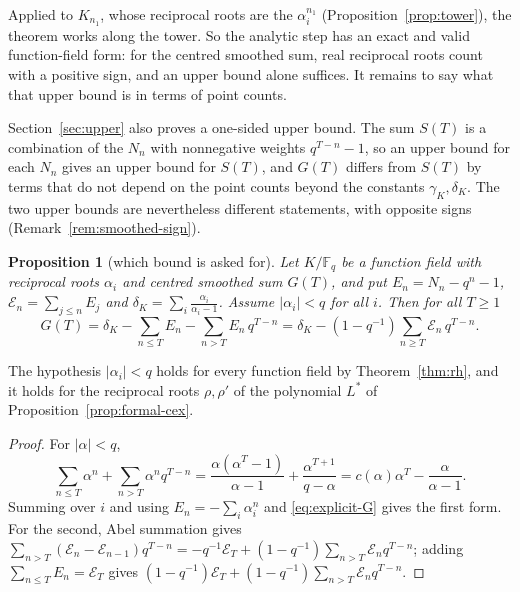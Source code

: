 \documentclass[11pt]{amsbook}
\theoremstyle{plain}
\newtheorem{proposition}[theorem]{Proposition}
\theoremstyle{definition}
\theoremstyle{remark}
\numberwithin{equation}{section}
\numberwithin{figure}{chapter}
\numberwithin{table}{chapter}
\newcommand{\F}{\mathbb{F}}
\newcommand{\calE}{\mathcal{E}}
\begin{document}
Applied to $K_{n_1}$, whose reciprocal roots are the
$\alpha_i^{n_1}$ (Proposition~\ref{prop:tower}), the theorem works
along the tower. So the analytic step has an exact and valid
function-field form: for the centred smoothed sum, real reciprocal
roots count with a positive sign, and an upper bound alone
suffices. It remains to say what that upper bound is in terms of
point counts.

Section~\ref{sec:upper} also proves a one-sided upper bound. The
sum $S(T)$ is a combination of the $N_n$ with nonnegative weights
$q^{T-n}-1$, so an upper bound for each $N_n$ gives an upper bound
for $S(T)$, and $G(T)$ differs from $S(T)$ by terms that do not
depend on the point counts beyond the constants
$\gamma_K,\delta_K$. The two upper bounds are nevertheless different
statements, with opposite signs (Remark~\ref{rem:smoothed-sign}).

\begin{proposition}[which bound is asked for]
\label{prop:which-bound}
Let $K/\F_q$ be a function field with reciprocal roots $\alpha_i$
and centred smoothed sum $G(T)$, and put $E_n=N_n-q^n-1$,
$\calE_n=\sum_{j\le n}E_j$ and
$\delta_K=\sum_i\frac{\alpha_i}{\alpha_i-1}$. Assume
$\lvert\alpha_i\rvert<q$ for all $i$. Then for all $T\ge1$
\begin{equation}\label{eq:which-bound}
G(T)=\delta_K-\sum_{n\le T}E_n-\sum_{n>T}E_n\,q^{T-n}
=\delta_K-(1-q^{-1})\sum_{n\ge T}\calE_n\,q^{T-n}.
\end{equation}
\end{proposition}

The hypothesis $\lvert\alpha_i\rvert<q$ holds for every function
field by Theorem~\ref{thm:rh}, and it holds for the reciprocal roots
$\rho,\rho'$ of the polynomial $L^*$ of
Proposition~\ref{prop:formal-cex}.

\begin{proof}
For $\lvert\alpha\rvert<q$,
\[
\sum_{n\le T}\alpha^n+\sum_{n>T}\alpha^nq^{T-n}
=\frac{\alpha(\alpha^T-1)}{\alpha-1}
+\frac{\alpha^{T+1}}{q-\alpha}
=c(\alpha)\alpha^T-\frac\alpha{\alpha-1}.
\]
Summing over $i$ and using $E_n=-\sum_i\alpha_i^n$ and
\eqref{eq:explicit-G} gives the first form. For the second, Abel
summation gives
$\sum_{n>T}(\calE_n-\calE_{n-1})q^{T-n}
=-q^{-1}\calE_T+(1-q^{-1})\sum_{n>T}\calE_nq^{T-n}$; adding
$\sum_{n\le T}E_n=\calE_T$ gives
$(1-q^{-1})\calE_T+(1-q^{-1})\sum_{n>T}\calE_nq^{T-n}$.
\end{proof}
\end{document}
